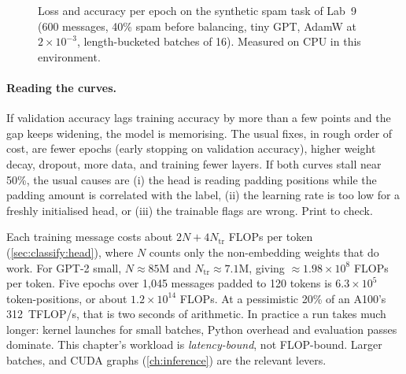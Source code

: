 \begin{figure}[ht]
\centering
{}
\caption{Loss and accuracy per epoch on the synthetic spam task of Lab~9 (600 messages,
40\% spam before balancing, tiny GPT, AdamW at $2\times10^{-3}$, length-bucketed batches
of 16). Measured on CPU in this environment.}
\label{fig:classify:curves}
\end{figure}

\paragraph{Reading the curves.} If validation accuracy lags training accuracy by more
than a few points and the gap keeps widening, the model is memorising. The usual fixes,
in rough order of cost, are fewer epochs (early stopping on validation accuracy),
higher weight decay, dropout, more data, and training fewer layers. If both curves
stall near 50\%, the usual causes are (i) the head is reading padding positions while
the padding amount is correlated with the label, (ii) the learning rate is too low for
a freshly initialised head, or (iii) the trainable flags are wrong. Print
 to check.

\begin{napkinmath}
Each training message costs about $2N + 4N_{\text{tr}}$ FLOPs per token
(\cref{sec:classify:head}), where $N$ counts only the non-embedding weights that do
work. For GPT-2 small, $N\approx 85$M and $N_{\text{tr}}\approx 7.1$M, giving
$\approx 1.98\times10^8$ FLOPs per token. Five epochs over 1{,}045 messages padded to
120 tokens is $6.3\times10^5$ token-positions, or about $1.2\times10^{14}$ FLOPs. At a
pessimistic 20\% of an A100's \SI{312}{TFLOP/s}, that is two seconds of arithmetic. In
practice a run takes much longer: kernel launches for small batches, Python overhead
and evaluation passes dominate. This chapter's workload is \emph{latency-bound}, not
FLOP-bound. Larger batches,  and CUDA graphs (\cref{ch:inference})
are the relevant levers.
\end{napkinmath}

